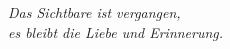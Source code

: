 \clearpage

\vspace*{4cm}
\begin{flushright}
\huge{\textit{Das Sichtbare ist vergangen,\\
es bleibt die Liebe und Erinnerung.}}
\end{flushright}

\clearpage
